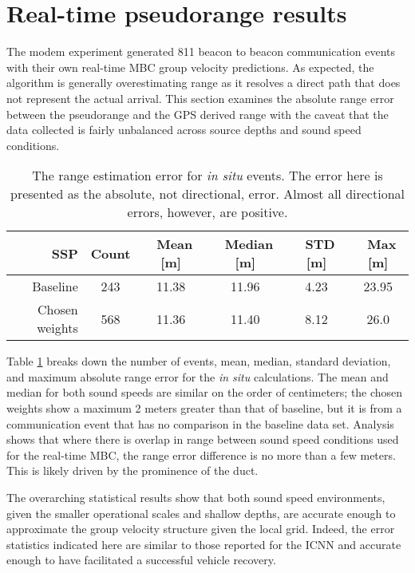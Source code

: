 
\FloatBarrier
\section{\label{sec:realtime} Real-time pseudorange results}

The modem experiment generated 811 beacon to beacon communication events with their own real-time MBC group velocity predictions.
As expected, the algorithm is generally overestimating range as it resolves a direct path that does not represent the actual arrival.
This section examines the absolute range error between the pseudorange and the GPS derived range with the caveat that the data collected is fairly unbalanced across source depths and sound speed conditions.

\begin{table}[h!]
\renewcommand{\arraystretch}{1.3}
\centering
\begin{tabular}{r|c|c|c|c|c}
SSP & Count & ~Mean [m] & ~Median [m] & ~STD [m] & ~Max [m] \\ \hline
Baseline & 243 & 11.38 & 11.96 & 4.23 & 23.95 \\ 
Chosen weights & 568 & 11.36 & 11.40 & 8.12 & 26.0 \\
\toprule
\end{tabular}
\caption[Range estimation error for \textit{in situ} events]{The range estimation error for \textit{in situ} events. The error here is presented as the absolute, not directional, error. Almost all directional errors, however, are positive.}
\label{tab:rangeErrorInSitu}
\end{table}

Table \ref{tab:rangeErrorInSitu} breaks down the number of events, mean, median, standard deviation, and maximum absolute range error for the \textit{in situ} calculations.
The mean and median for both sound speeds are similar on the order of centimeters; the chosen weights show a maximum 2 meters greater than that of baseline, but it is from a communication event that has no comparison in the baseline data set.
Analysis shows that where there is overlap in range between sound speed conditions used for the real-time MBC, the range error difference is no more than a few meters.
This is likely driven by the prominence of the duct.

The overarching statistical results show that both sound speed environments, given the smaller operational scales and shallow depths, are accurate enough to approximate the group velocity structure given the local grid.
Indeed, the error statistics indicated here are similar to those reported for the ICNN \citep{randeni_high-resolution_2021} and accurate enough to have facilitated a successful vehicle recovery.

